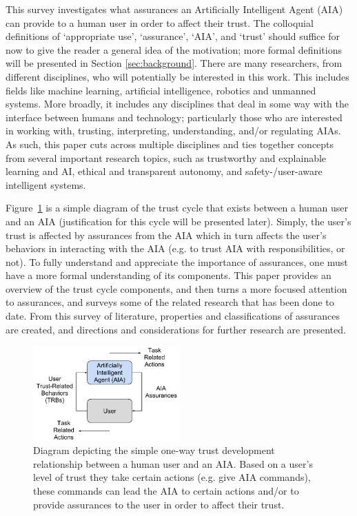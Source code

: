 This survey investigates what assurances an Artificially Intelligent Agent (AIA) can provide to a human user in order to affect their trust. The colloquial definitions of `appropriate use', `assurance', `AIA', and `trust' should suffice for now to give the reader a general idea of the motivation; more formal definitions will be presented in Section \ref{sec:background}. There are many researchers, from different disciplines, who will potentially be interested in this work. This includes fields like machine learning, artificial intelligence, robotics and unmanned systems. More broadly, it includes any disciplines that deal in some way with the interface between humans and technology; particularly those who are interested in working with, trusting, interpreting, understanding, and/or regulating AIAs. As such, this paper cuts across multiple disciplines and ties together concepts from several important research topics, such as trustworthy and explainable learning and AI, ethical and transparent autonomy, and safety-/user-aware intelligent systems.

    Figure~\ref{fig:SimpleTrust_one_way} is a simple diagram of the trust cycle that exists between a human user and an AIA (justification for this cycle will be presented later). Simply, the user's trust is affected by assurances from the AIA which in turn affects the user's behaviors in interacting with the AIA (e.g. to trust AIA with responsibilities, or not). To fully understand and appreciate the importance of assurances, one must have a more formal understanding of its components. This paper provides an overview of the trust cycle components, and then turns a more focused attention to assurances, and surveys some of the related research that has been done to date. From this survey of literature, properties and classifications of assurances are created, and directions and considerations for further research are presented.

    \begin{figure}
        \centering
        \includegraphics[width=0.5\textwidth]{Figures/SimpleTrust_one_way}
        \caption{Diagram depicting the simple one-way trust development relationship between a human user and an AIA. Based on a user's level of trust they take certain actions (e.g. give AIA commands), these commands can lead the AIA to certain actions and/or to provide assurances to the user in order to affect their trust.}
        \label{fig:SimpleTrust_one_way}
    \end{figure}

